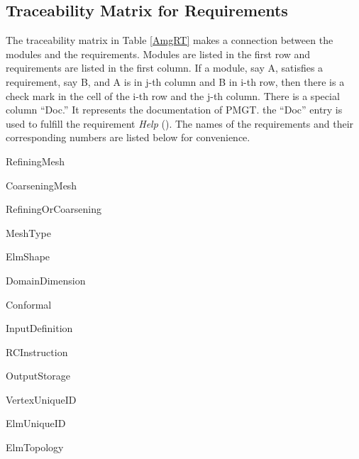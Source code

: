 \documentclass[12pt,titlepage]{article}
\begin{document}
\subsection{Traceability Matrix for Requirements \label{AmgSecRT}}
The traceability matrix in Table \ref{AmgRT} makes a connection between the modules and the requirements. Modules are listed in the first row and requirements are listed in the first column. If a module, say A, satisfies a requirement, say B, and A is in j-th column and B in i-th row, then there is a check mark \checkmark in the cell of the i-th row and the j-th column. There is a special column ``Doc.'' It represents the documentation of PMGT. the ``Doc'' entry is used to fulfill the requirement {\em Help} ().
The names of the requirements and their corresponding numbers are listed below for convenience.
\begin{description}\label{pagereq}
 \label{RefiningMesh}
\item[\fref{RefiningMesh}:] RefiningMesh 
 \label{CoarseningMesh}
\item[\fref{CoarseningMesh}:] CoarseningMesh
 \label{RefiningOrCoarsening}
\item[\fref{RefiningOrCoarsening}:] RefiningOrCoarsening
 \label{MeshType}
\item[\fref{MeshType}:] MeshType
 \label{ElmShape}
\item[\fref{ElmShape}:] ElmShape
 \label{DomainDimension}
\item[\fref{DomainDimension}:] DomainDimension
 \label{Conformal}
\item[\fref{Conformal}:] Conformal
 \label{InputDefinition}
\item[\fref{InputDefinition}:] InputDefinition
 \label{RCInstruction}
\item[\fref{RCInstruction}:] RCInstruction
 \label{OutputStorage}
\item[\fref{OutputStorage}:] OutputStorage
 \label{VertexUniqueID}
\item[\fref{VertexUniqueID}:] VertexUniqueID
 \label{ElmUniqueID}
\item[\fref{ElmUniqueID}:] ElmUniqueID
 \label{ElmTopology}
\item[\fref{ElmTopology}:] ElmTopology
 \label{OutElmOrder}

\end{description}
\end{document}
